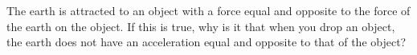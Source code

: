          The earth is attracted to an object with a force equal
        and opposite to the force of the earth on the object. If
        this is true, why is it that when you drop an object, the
        earth does not have an acceleration equal and opposite to
        that of the object?
